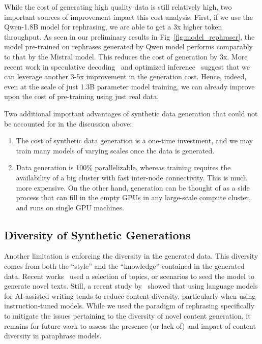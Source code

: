 \documentclass[table]{article}
\begin{document}
While the cost of generating high quality data is still relatively high, two important sources of improvement impact this cost analysis.  First, if we use the Qwen-1.8B model \cite{bai2023qwen} for rephrasing, we are able to get a 3x higher token throughput. As seen in our preliminary results in Fig~\ref{fig:model_rephraser}, the model pre-trained on rephrases generated by Qwen model performs comparably to that by the Mistral model. This reduces the cost of generation by 3x. More recent work in speculative decoding~\citep{liu2023online} and optimized inference~\citep{xia2024unlocking} suggest that we can leverage another 3-5x improvement in the generation cost. Hence, indeed, even at the scale of just 1.3B parameter model training, we can already improve upon the cost of pre-training using just real data.

Two additional important advantages of synthetic data generation that could not be accounted for in the discussion above:
\begin{enumerate}
    \item The cost of synthetic data generation is a one-time investment, and we may train many models of varying scales once the data is generated.
    \item Data generation is 100\% parallelizable, whereas training requires the availability of a big cluster with fast inter-node connectivity. This is much more expensive. On the other hand, generation can be thought of as a side process that can fill in the empty GPUs in any large-scale compute cluster, and runs on single GPU machines.
\end{enumerate}

\subsection{Diversity of Synthetic Generations}
Another limitation is enforcing the diversity in the generated data. This diversity comes from both the ``style'' and the ``knowledge'' contained in the generated data. Recent works~\citep{li2023self,li2023textbooks} used a selection of topics, or scenarios to seed the model to generate novel texts.  Still, a recent study by~\citet{padmakumar-etal-2023-investigating} showed that using language models for AI-assisted writing tends to reduce content diversity, particularly when using instruction-tuned models. While we used the paradigm of rephrasing specifically to mitigate the issues pertaining to the diversity of novel content generation, it remains for future work to assess the presence (or lack of) and impact of content diversity in paraphrase models.
\end{document}
